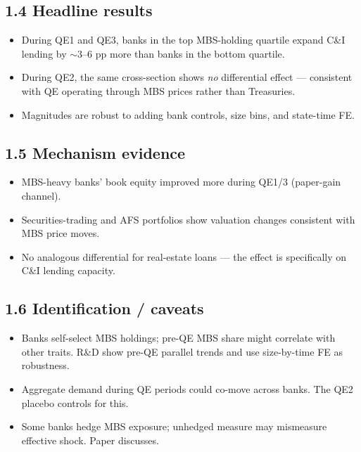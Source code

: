 \documentclass[11pt]{article}
\begin{document}
\subsection*{1.4 Headline results}
\begin{itemize}
\item During QE1 and QE3, banks in the top MBS-holding quartile expand C\&I lending by $\sim$3--6 pp more than banks in the bottom quartile.
\item During QE2, the same cross-section shows \emph{no} differential effect --- consistent with QE operating through MBS prices rather than Treasuries.
\item Magnitudes are robust to adding bank controls, size bins, and state-time FE.
\end{itemize}

\subsection*{1.5 Mechanism evidence}
\begin{itemize}
\item MBS-heavy banks' book equity improved more during QE1/3 (paper-gain channel).
\item Securities-trading and AFS portfolios show valuation changes consistent with MBS price moves.
\item No analogous differential for real-estate loans --- the effect is specifically on C\&I lending capacity.
\end{itemize}

\subsection*{1.6 Identification / caveats}
\begin{alertbox}
\begin{itemize}
\item Banks self-select MBS holdings; pre-QE MBS share might correlate with other traits. R\&D show pre-QE parallel trends and use size-by-time FE as robustness.
\item Aggregate demand during QE periods could co-move across banks. The QE2 placebo controls for this.
\item Some banks hedge MBS exposure; unhedged measure may mismeasure effective shock. Paper discusses.
\end{itemize}
\end{alertbox}
\end{document}

